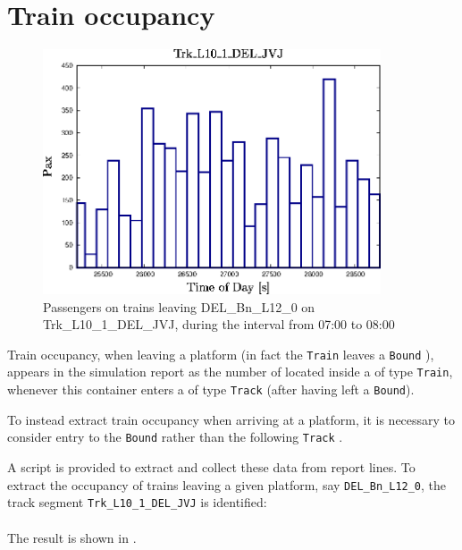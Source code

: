 \section{Train occupancy}
\begin{figure}[!ht]
  \centering
  \includegraphics[angle=0,width=10cm]{90_figs/_Occupancy_Trk_L10_1_DEL_JVJ.eps}
  \caption{Passengers on trains leaving DEL\_Bn\_L12\_0 on Trk\_L10\_1\_DEL\_JVJ, during the interval from 07:00 to 08:00}
  \label{TrainOccup}
\end{figure}
Train occupancy, when leaving a platform (in fact the
{\tt Train}  leaves a {\tt Bound} ), appears in the
simulation report as the number of  located inside
a  of type {\tt Train}, whenever this container enters
a  of type {\tt Track} (after having left a {\tt Bound}).

To instead extract train occupancy when arriving at a platform, it is necessary to
consider entry to the {\tt Bound}  rather than the following {\tt Track} .

A script is provided to extract and collect these data from report lines.
To extract the occupancy of trains leaving a given platform, say {\tt DEL\_Bn\_L12\_0},
the track segment {\tt Trk\_L10\_1\_DEL\_JVJ} is identified: \\
 \\
The result is shown in .

